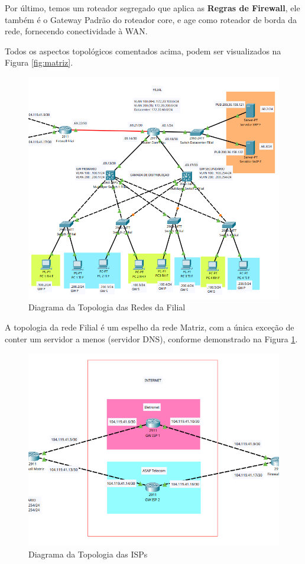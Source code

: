 \documentclass[a4paper, 12pt]{article}
\begin{document}
Por último, temos um roteador segregado que aplica as \textbf{Regras de Firewall}, ele também é o Gateway Padrão do roteador core, e age como roteador de borda da rede, fornecendo conectividade à WAN.

Todos os aspectos topológicos comentados acima, podem ser visualizados na Figura \ref{fig:matriz}.

\begin{figure}[H]
    \centering
    \includegraphics[width=0.8\linewidth]{filial.png}
    \caption{Diagrama da Topologia das Redes da Filial}
    \label{fig:filial}
\end{figure}

A topologia da rede Filial é um espelho da rede Matriz, com a única exceção de conter um servidor a menos (servidor DNS), conforme demonstrado na Figura \ref{fig:filial}. 

\begin{figure}[H]
    \centering
    \includegraphics[width=0.8\linewidth]{isp.png}
    \caption{Diagrama da Topologia das ISPs}
    \label{fig:isp}
\end{figure}
\end{document}
